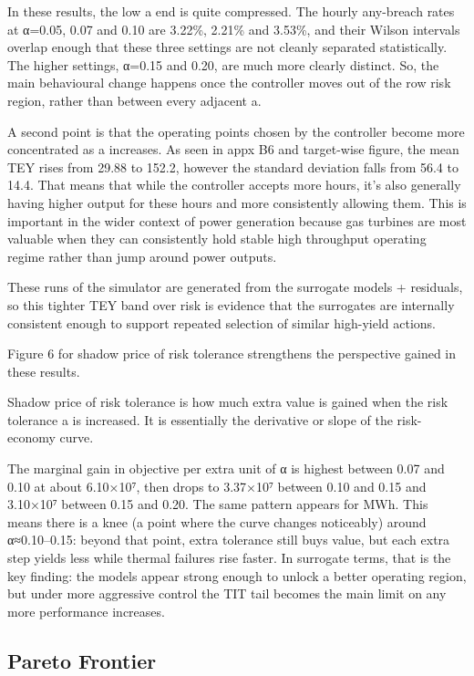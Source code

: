 \documentclass[11pt]{article}
\begin{document}
In these results, the low a end is quite compressed. The hourly
any-breach rates at α=0.05, 0.07 and 0.10 are 3.22\%, 2.21\% and 3.53\%,
and their Wilson intervals overlap enough that these three settings are
not cleanly separated statistically. The higher settings, α=0.15 and
0.20, are much more clearly distinct. So, the main behavioural change
happens once the controller moves out of the row risk region, rather
than between every adjacent a.

A second point is that the operating points chosen by the controller
become more concentrated as a increases. As seen in appx B6 and
target-wise figure, the mean TEY rises from 29.88 to 152.2, however the
standard deviation falls from 56.4 to 14.4. That means that while the
controller accepts more hours, it's also generally having higher output
for these hours and more consistently allowing them. This is important
in the wider context of power generation because gas turbines are most
valuable when they can consistently hold stable high throughput
operating regime rather than jump around power outputs.

These runs of the simulator are generated from the surrogate models +
residuals, so this tighter TEY band over risk is evidence that the
surrogates are internally consistent enough to support repeated
selection of similar high-yield actions.

Figure 6 for shadow price of risk tolerance strengthens the perspective
gained in these results.

Shadow price of risk tolerance is how much extra value is gained when
the risk tolerance a is increased. It is essentially the derivative or
slope of the risk-economy curve.

The marginal gain in objective per extra unit of α is highest between
0.07 and 0.10 at about 6.10×10⁷, then drops to 3.37×10⁷ between 0.10 and
0.15 and 3.10×10⁷ between 0.15 and 0.20. The same pattern appears for
MWh. This means there is a knee (a point where the curve changes
noticeably) around α≈0.10--0.15: beyond that point, extra tolerance
still buys value, but each extra step yields less while thermal failures
rise faster. In surrogate terms, that is the key finding: the models
appear strong enough to unlock a better operating region, but under more
aggressive control the TIT tail becomes the main limit on any more
performance increases.

\subsection{Pareto Frontier}\label{pareto-frontier}
\end{document}
